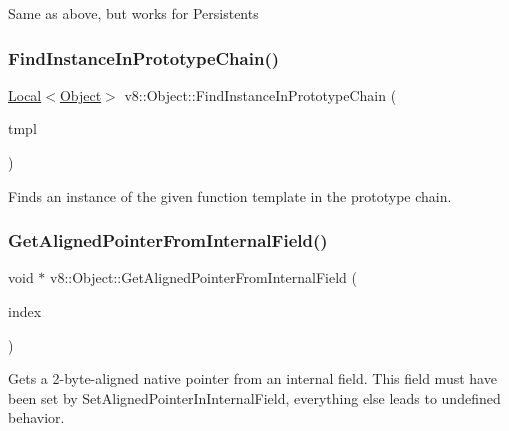 Same as above, but works for Persistents \mbox{\label{classv8_1_1Object_ae2ad9fee9db6e0e5da56973ebb8ea2bc}} 
\subsubsection{\texorpdfstring{Find\+Instance\+In\+Prototype\+Chain()}{FindInstanceInPrototypeChain()}}
{\footnotesize\ttfamily \mbox{\hyperlink{classv8_1_1Local}{Local}}$<$\mbox{\hyperlink{classv8_1_1Object}{Object}}$>$ v8\+::\+Object\+::\+Find\+Instance\+In\+Prototype\+Chain (\begin{DoxyParamCaption}\item[{\mbox{\hyperlink{classv8_1_1Local}{Local}}$<$ \mbox{\hyperlink{classv8_1_1FunctionTemplate}{Function\+Template}} $>$}]{tmpl }\end{DoxyParamCaption})}

Finds an instance of the given function template in the prototype chain. \mbox{\label{classv8_1_1Object_a435f68bb7ef0f64dd522c5c910682448}} 
\subsubsection{\texorpdfstring{Get\+Aligned\+Pointer\+From\+Internal\+Field()}{GetAlignedPointerFromInternalField()}\hspace{0.1cm}{\footnotesize\ttfamily [1/2]}}
{\footnotesize\ttfamily void $\ast$ v8\+::\+Object\+::\+Get\+Aligned\+Pointer\+From\+Internal\+Field (\begin{DoxyParamCaption}\item[{int}]{index }\end{DoxyParamCaption})}

Gets a 2-\/byte-\/aligned native pointer from an internal field. This field must have been set by Set\+Aligned\+Pointer\+In\+Internal\+Field, everything else leads to undefined behavior. \mbox{\label{classv8_1_1Object_a65b5a3dc93c0774594f8b0f2ab5481c8}} 
